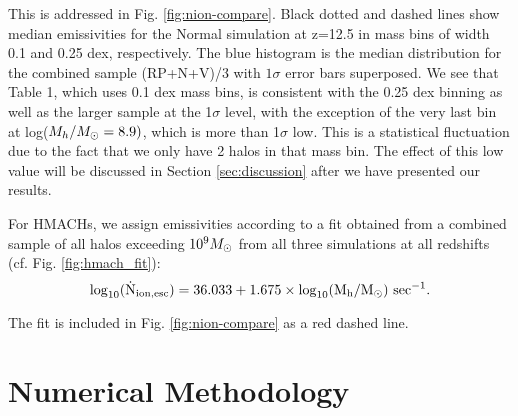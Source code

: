 \documentclass[iop,apj]{emulateapj}
\begin{document}
This is addressed in Fig. \ref{fig:nion-compare}. Black dotted and dashed lines show median emissivities for the Normal simulation at z=12.5 in mass bins of width 0.1 and 0.25 dex, respectively. The blue histogram is the median distribution for the combined sample (RP+N+V)/3 with $1\sigma$ error bars superposed. We see that Table 1, which uses 0.1 dex mass bins, is consistent with the 0.25 dex binning as well as the larger sample at the 1$\sigma$ level, with the exception of the very last bin at log($\mh/\Ms = 8.9)$, which is more than 1$\sigma$ low. This is a statistical fluctuation due to the fact that we only have 2 halos in that mass bin. The effect of this low value will be discussed in Section \ref{sec:discussion} after we have presented our results. 

For HMACHs, we assign emissivities according to a fit obtained from a combined sample of all halos exceeding $10^9 \Ms$ from all three simulations at all redshifts (cf. Fig. \ref{fig:hmach_fit}):
\begin{equation}
  \label{eqn:emis9}
\rm{log}_{10}(\dot{N}_{\rm ion,esc}) = 36.033+1.675\times \rm{log}_{10}(\mh/\Ms) ~sec^{-1}.
\end{equation}

\noindent 
The fit is included in Fig. \ref{fig:nion-compare} as a red dashed line.



\section{Numerical Methodology}
\end{document}
